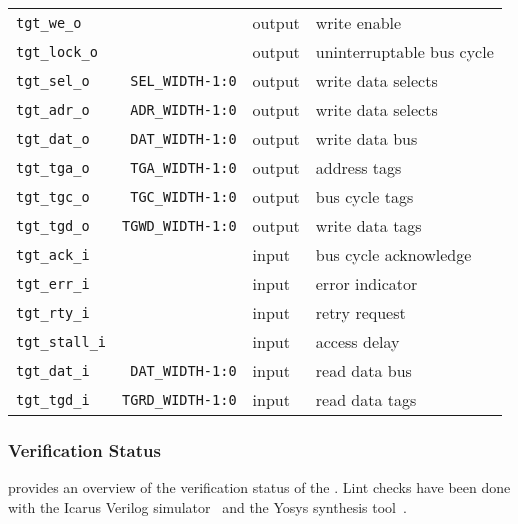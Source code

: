 \begin{center}
\begin{longtable}{|l|r|l|l|}
    \texttt{tgt\_we\_o}          &                          & output & write enable              \\*
    \texttt{tgt\_lock\_o}        &                          & output & uninterruptable bus cycle \\*
    \texttt{tgt\_sel\_o}         & \texttt{SEL\_WIDTH-1:0}  & output & write data selects        \\*
    \texttt{tgt\_adr\_o}         & \texttt{ADR\_WIDTH-1:0}  & output & write data selects        \\*
    \texttt{tgt\_dat\_o}         & \texttt{DAT\_WIDTH-1:0}  & output & write data bus            \\*
    \texttt{tgt\_tga\_o}         & \texttt{TGA\_WIDTH-1:0}  & output & address tags              \\*
    \texttt{tgt\_tgc\_o}         & \texttt{TGC\_WIDTH-1:0}  & output & bus cycle tags            \\*
    \texttt{tgt\_tgd\_o}         & \texttt{TGWD\_WIDTH-1:0} & output & write data tags           \\*
    \texttt{tgt\_ack\_i}         &                          & input  & bus cycle acknowledge     \\*
    \texttt{tgt\_err\_i}         &                          & input  & error indicator           \\*
    \texttt{tgt\_rty\_i}         &                          & input  & retry request             \\*
    \texttt{tgt\_stall\_i}       &                          & input  & access delay              \\*
    \texttt{tgt\_dat\_i}         & \texttt{DAT\_WIDTH-1:0}  & input  & read data bus             \\*
    \texttt{tgt\_tgd\_i}         & \texttt{TGRD\_WIDTH-1:0} & input  & read data tags            \\   
  \end{longtable}
\end{center}  
\endgroup

\subsubsection{Verification Status}
\label{accel:verif}

 provides an overview of the verification status of the .
Lint checks have been done with the Icarus Verilog simulator~\cite{iverilog} and the Yosys synthesis tool~\cite{yosys}.

